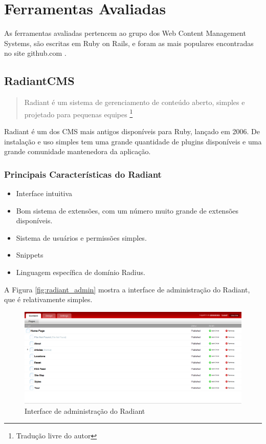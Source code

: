 \chapter{Ferramentas Avaliadas}

As ferramentas avaliadas pertencem ao grupo dos Web Content Management Systems, são escritas em Ruby on Rails, e foram as mais populares encontradas no site github.com .

\section{RadiantCMS}

\begin{quote}
Radiant é um sistema de gerenciamento de conteúdo aberto, simples e projetado para pequenas equipes
\cite{radiant_website}\footnote{Tradução livre do autor}
\end{quote}

Radiant é um dos CMS mais antigos disponíveis para Ruby, lançado em 2006. De instalação e uso simples tem uma grande quantidade de plugins disponíveis e uma grande comunidade mantenedora da aplicação.

\subsection{Principais Características do Radiant}

\begin{itemize}
  \item Interface intuitiva
  \item Bom sistema de extensões, com um número muito grande de extensões disponíveis.
  \item Sistema de usuários e permissões simples.
  \item Snippets
  \item Linguagem específica de domínio Radius.
\end{itemize}

A Figura \ref{fig:radiant_admin} mostra a interface de administração do Radiant, que é relativamente simples.

\begin{figure}[here]
\includegraphics[width=150mm]{images/radiant_admin.png}
\caption{Interface de administração do Radiant}
\label{fig:radiant_admin.png}
\end{figure}

